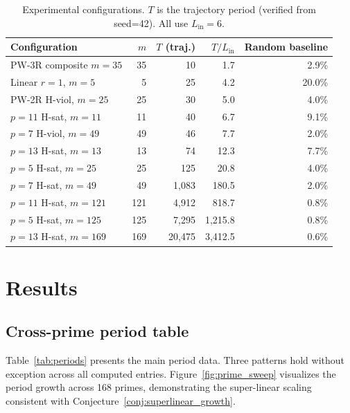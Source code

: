 \documentclass[11pt]{article}
\theoremstyle{plain}
\theoremstyle{definition}
\begin{document}
\begin{table}[ht]
\centering
\caption{Experimental configurations. $T$ is the trajectory period (verified from seed=42). All use $L_{\mathrm{in}}=6$.}
\label{tab:configs}
\medskip
\begin{tabular}{@{}lrrrr@{}}
\toprule
Configuration & $m$ & $T$ (traj.) & $T/L_{\mathrm{in}}$ & Random baseline\\
\midrule
PW-3R composite $m=35$           & 35  & 10           & 1.7      & 2.9\%\\
Linear $r=1$, $m=5$              & 5   & 25           & 4.2      & 20.0\%\\
PW-2R H-viol, $m=25$             & 25  & 30           & 5.0      & 4.0\%\\
$p=11$ H-sat, $m=11$             & 11  & 40           & 6.7      & 9.1\%\\
$p=7$ H-viol, $m=49$             & 49  & 46           & 7.7      & 2.0\%\\
$p=13$ H-sat, $m=13$             & 13  & 74           & 12.3     & 7.7\%\\
$p=5$ H-sat, $m=25$              & 25  & 125          & 20.8     & 4.0\%\\
\midrule
$p=7$ H-sat, $m=49$              & 49  & 1{,}083       & 180.5    & 2.0\%\\
$p=11$ H-sat, $m=121$            & 121 & 4{,}912       & 818.7    & 0.8\%\\
$p=5$ H-sat, $m=125$             & 125 & 7{,}295       & 1{,}215.8 & 0.8\%\\
$p=13$ H-sat, $m=169$            & 169 & 20{,}475      & 3{,}412.5 & 0.6\%\\
\bottomrule
\end{tabular}
\end{table}

\section{Results}
\label{sec:results}

\subsection{Cross-prime period table}
\label{sec:results:period}

Table~\ref{tab:periods} presents the main period data. Three patterns hold without exception across all computed entries. Figure~\ref{fig:prime_sweep} visualizes the period growth across 168 primes, demonstrating the super-linear scaling consistent with Conjecture~\ref{conj:superlinear_growth}.
\end{document}
